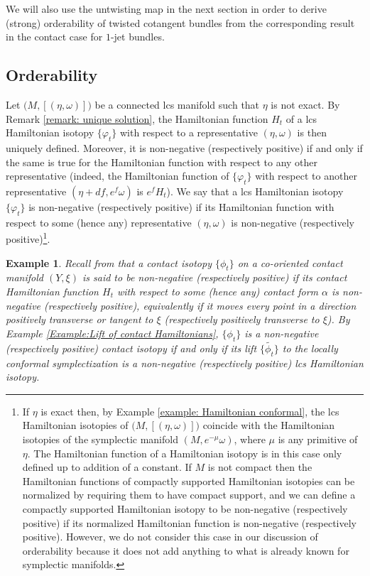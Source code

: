 \documentclass{amsart}
\newtheorem{example}[thm]{Example}
\theoremstyle{remark}
\begin{document}
We will also use the untwisting map in the next section
in order to derive (strong) orderability of twisted cotangent bundles
from the corresponding result in the contact case
for $1$-jet bundles.


\subsection{Orderability}\label{section: orderability}

Let $\big( M, [(\eta, \omega)] \big)$ be a connected lcs manifold
such that $\eta$ is not exact.
By Remark \ref{remark: unique solution},
the Hamiltonian function $H_t$
of a lcs Hamiltonian isotopy $\{\varphi_t\}$
with respect to a representative $(\eta, \omega)$
is then uniquely defined.
Moreover,
it is non-negative (respectively positive)
if and only if the same is true
for the Hamiltonian function with respect to any other representative
(indeed,
the Hamiltonian function of $\{\varphi_t\}$
with respect to another representative $(\eta + df, e^f\omega)$ is $e^f H_t$).
We say that a lcs Hamiltonian isotopy $\{\varphi_t\}$
is non-negative (respectively positive)
if its Hamiltonian function
with respect to some (hence any) representative $(\eta, \omega)$
is non-negative (respectively positive)\footnote{If $\eta$ is exact
then, by Example \ref{example: Hamiltonian conformal},
the lcs Hamiltonian isotopies of $\big( M, [(\eta, \omega)] \big)$
coincide with the Hamiltonian isotopies
of the symplectic manifold $(M, e^{-\mu}\omega)$,
where $\mu$ is any primitive of $\eta$.
The Hamiltonian function of a Hamiltonian isotopy
is in this case only defined up to addition of a constant.
If $M$ is not compact
then the Hamiltonian functions of compactly supported Hamiltonian isotopies
can be normalized by requiring them to have compact support,
and we can define a compactly supported Hamiltonian isotopy
to be non-negative (respectively positive)
if its normalized Hamiltonian function
is non-negative (respectively positive).
However,
we do not consider this case in our discussion
of orderability
because it does not add anything
to what is already known for symplectic manifolds.}.

\begin{example}\label{example: orderabiliity cf contact}
Recall from \cite{EP}
that a contact isotopy $\{\phi_t\}$
on a co-oriented contact manifold $(Y, \xi)$
is said to be non-negative (respectively positive)
if its contact Hamiltonian function $H_t$
with respect to some (hence any) contact form $\alpha$
is non-negative (respectively positive),
equivalently if it moves every point
in a direction positively transverse or tangent to $\xi$
(respectively positively transverse to $\xi$).
By Example \ref{Example:Lift of contact Hamiltonians},
$\{\phi_t\}$ is a non-negative (respectively positive) contact isotopy
if and only if its lift $\{\widetilde{\phi_t}\}$
to the locally conformal symplectization
is a non-negative (respectively positive) lcs Hamiltonian isotopy.
\end{example}
\end{document}
